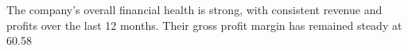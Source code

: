 

The company's overall financial health is strong, with consistent revenue and profits over the last 12 months. Their gross profit margin has remained steady at 60.58%